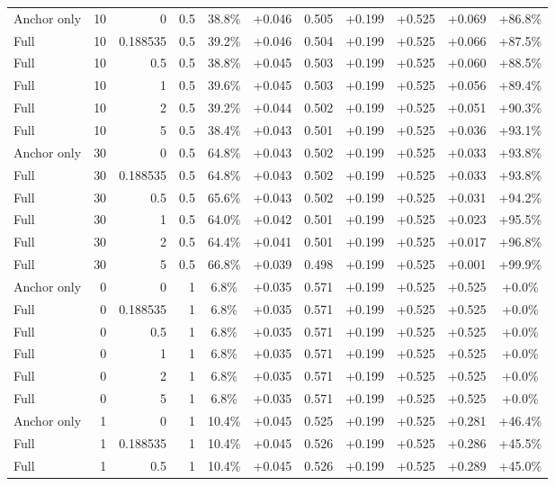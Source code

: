 \begin{table}[htbp]
\begin{tabular}{lrrrccccccc}
Anchor only & 10 & 0 & 0.5 & 38.8\% & +0.046 & 0.505 & +0.199 & +0.525 & +0.069 & +86.8\% \\
Full & 10 & 0.188535 & 0.5 & 39.2\% & +0.046 & 0.504 & +0.199 & +0.525 & +0.066 & +87.5\% \\
Full & 10 & 0.5 & 0.5 & 38.8\% & +0.045 & 0.503 & +0.199 & +0.525 & +0.060 & +88.5\% \\
Full & 10 & 1 & 0.5 & 39.6\% & +0.045 & 0.503 & +0.199 & +0.525 & +0.056 & +89.4\% \\
Full & 10 & 2 & 0.5 & 39.2\% & +0.044 & 0.502 & +0.199 & +0.525 & +0.051 & +90.3\% \\
Full & 10 & 5 & 0.5 & 38.4\% & +0.043 & 0.501 & +0.199 & +0.525 & +0.036 & +93.1\% \\
Anchor only & 30 & 0 & 0.5 & 64.8\% & +0.043 & 0.502 & +0.199 & +0.525 & +0.033 & +93.8\% \\
Full & 30 & 0.188535 & 0.5 & 64.8\% & +0.043 & 0.502 & +0.199 & +0.525 & +0.033 & +93.8\% \\
Full & 30 & 0.5 & 0.5 & 65.6\% & +0.043 & 0.502 & +0.199 & +0.525 & +0.031 & +94.2\% \\
Full & 30 & 1 & 0.5 & 64.0\% & +0.042 & 0.501 & +0.199 & +0.525 & +0.023 & +95.5\% \\
Full & 30 & 2 & 0.5 & 64.4\% & +0.041 & 0.501 & +0.199 & +0.525 & +0.017 & +96.8\% \\
Full & 30 & 5 & 0.5 & 66.8\% & +0.039 & 0.498 & +0.199 & +0.525 & +0.001 & +99.9\% \\
Anchor only & 0 & 0 & 1 & 6.8\% & +0.035 & 0.571 & +0.199 & +0.525 & +0.525 & +0.0\% \\
Full & 0 & 0.188535 & 1 & 6.8\% & +0.035 & 0.571 & +0.199 & +0.525 & +0.525 & +0.0\% \\
Full & 0 & 0.5 & 1 & 6.8\% & +0.035 & 0.571 & +0.199 & +0.525 & +0.525 & +0.0\% \\
Full & 0 & 1 & 1 & 6.8\% & +0.035 & 0.571 & +0.199 & +0.525 & +0.525 & +0.0\% \\
Full & 0 & 2 & 1 & 6.8\% & +0.035 & 0.571 & +0.199 & +0.525 & +0.525 & +0.0\% \\
Full & 0 & 5 & 1 & 6.8\% & +0.035 & 0.571 & +0.199 & +0.525 & +0.525 & +0.0\% \\
Anchor only & 1 & 0 & 1 & 10.4\% & +0.045 & 0.525 & +0.199 & +0.525 & +0.281 & +46.4\% \\
Full & 1 & 0.188535 & 1 & 10.4\% & +0.045 & 0.526 & +0.199 & +0.525 & +0.286 & +45.5\% \\
Full & 1 & 0.5 & 1 & 10.4\% & +0.045 & 0.526 & +0.199 & +0.525 & +0.289 & +45.0\% \\

\end{tabular}
\end{table}
